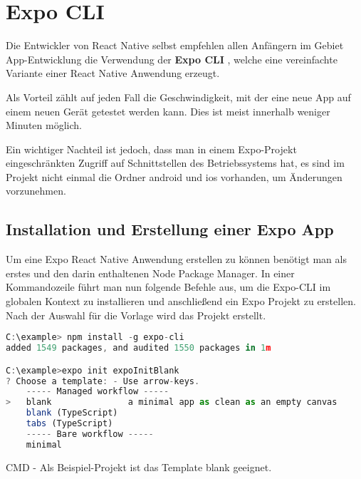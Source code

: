 \section{Expo CLI}
\label{expocli}
Die Entwickler von React Native selbst empfehlen allen Anfängern im Gebiet App-Entwicklung die
Verwendung der \textbf{Expo CLI} \cite{expocli}, welche eine vereinfachte Variante einer React Native Anwendung erzeugt.

Als Vorteil zählt auf jeden Fall die Geschwindigkeit, mit der eine neue App auf einem neuen Gerät
getestet werden kann. Dies ist meist innerhalb weniger Minuten möglich.

Ein wichtiger Nachteil ist jedoch, dass man in einem Expo-Projekt eingeschränkten Zugriff auf
Schnittstellen des Betriebssystems hat, es sind im Projekt nicht einmal die Ordner android und ios
vorhanden, um Änderungen vorzunehmen.

\subsection{Installation und Erstellung einer Expo App}
Um eine Expo React Native Anwendung erstellen zu können benötigt man als erstes  und
den darin enthaltenen Node Package Manager. In einer Kommandozeile führt man nun folgende Befehle
aus, um die Expo-CLI im globalen Kontext zu installieren und anschließend ein Expo Projekt zu
erstellen. Nach der Auswahl für die Vorlage wird das Projekt erstellt.


\begin{code}[htp]
\begin{lstlisting}[firstnumber=1,language=JavaScript, style=CMD]
C:\example> npm install -g expo-cli
added 1549 packages, and audited 1550 packages in 1m

C:\example>expo init expoInitBlank
? Choose a template: - Use arrow-keys.
    ----- Managed workflow -----
>   blank               a minimal app as clean as an empty canvas
    blank (TypeScript)
    tabs (TypeScript)
    ----- Bare workflow -----
    minimal
\end{lstlisting}
\caption{CMD - Als Beispiel-Projekt ist das Template blank geeignet.}
\end{code}


